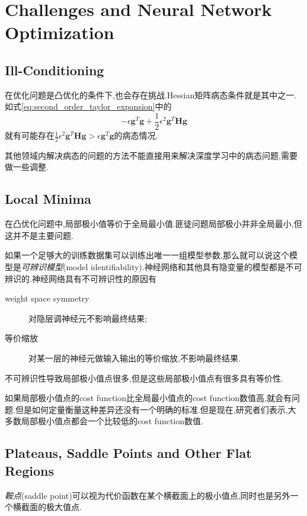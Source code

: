 \section{Challenges and Neural Network Optimization}

\subsection{Ill-Conditioning}

在优化问题是凸优化的条件下,也会存在挑战.Hessian矩阵病态条件就是其中之一.如式\ref{eq:second_order_taylor_expansion}中的
\begin{equation}
-\epsilon\mathbf g^T\mathbf g+\frac{1}{2}\epsilon^2\mathbf g^T\mathbf{Hg}
\end{equation}
就有可能存在$\frac{1}{2}\epsilon^2\mathbf g^T\mathbf{Hg}>\epsilon\mathbf g^T\mathbf g$的病态情况.

其他领域内解决病态的问题的方法不能直接用来解决深度学习中的病态问题,需要做一些调整.

\subsection{Local Minima}

在凸优化问题中,局部极小值等价于全局最小值.匪徒问题局部极小并非全局最小,但这并不是主要问题.

如果一个足够大的训练数据集可以训练出唯一一组模型参数,那么就可以说这个模型是\textit{可辨识模型}(model identifiability).神经网络和其他具有隐变量的模型都是不可辨识的.神经网络具有不可辨识性的原因有
\begin{description}
    \item [weight space symmetry]对隐层调神经元不影响最终结果;
    \item [等价缩放]对某一层的神经元做输入输出的等价缩放,不影响最终结果.
\end{description}

不可辨识性导致局部极小值点很多,但是这些局部极小值点有很多具有等价性.

如果局部极小值点的cost function比全局最小值点的cost function数值高,就会有问题.但是如何定量衡量这种差异还没有一个明确的标准.但是现在,研究者们表示,大多数局部极小值点都会一个比较低的cost function数值.

\subsection{Plateaus, Saddle Points and Other Flat Regions}

\textit{鞍点}(saddle point)可以视为代价函数在某个横截面上的极小值点,同时也是另外一个横截面的极大值点.

